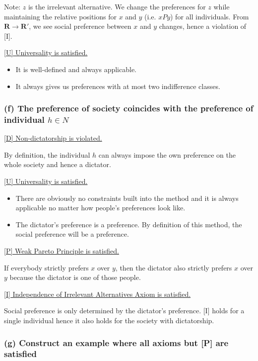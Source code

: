 \documentclass[a4paper]{article}
\begin{document}
Note: $z$ is the irrelevant alternative. We change the preferences for $z$ while maintaining the relative positions for $x$ and $y$ (i.e. $xPy$) for all individuals. From $\mathbf{R}\to\mathbf{R'}$, we see social preference between $x$ and $y$ changes, hence a violation of [I].

\underline{[U] Universality is satisfied.}

\begin{itemize}
    \item It is well-defined and always applicable.
    \item It always gives us preferences with at most two indifference classes.
\end{itemize}

\subsubsection*{(f) The preference of society coincides with the preference of individual $h\in N$}

\underline{[D] Non-dictatorship is violated.} 

By definition, the individual $h$ can always impose the own preference on the whole society and hence a dictator.

\underline{[U] Universality is satisfied.}

\begin{itemize}
    \item There are obviously no constraints built into the method and it is always applicable no matter how people's preferences look like.
    \item The dictator's preference is a preference. By definition of this method, the social preference will be a preference.
\end{itemize}

\underline{[P] Weak Pareto Principle is satisfied.}

If everybody strictly prefers $x$ over $y$, then the dictator also strictly prefers $x$ over $y$ because the dictator is one of those people.

\underline{[I] Independence of Irrelevant Alternatives Axiom is satisfied.}

Social preference is only determined by the dictator's preference. [I] holds for a single individual hence it also holds for the society with dictatorship. 

\subsubsection*{(g) Construct an example where all axioms but [P] are satisfied}
\end{document}
